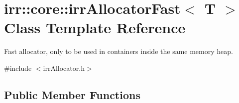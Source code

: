 \hypertarget{classirr_1_1core_1_1irrAllocatorFast}{}\section{irr\+:\+:core\+:\+:irr\+Allocator\+Fast$<$ T $>$ Class Template Reference}
\label{classirr_1_1core_1_1irrAllocatorFast}


Fast allocator, only to be used in containers inside the same memory heap.  




{\ttfamily \#include $<$irr\+Allocator.\+h$>$}

\subsection*{Public Member Functions}
